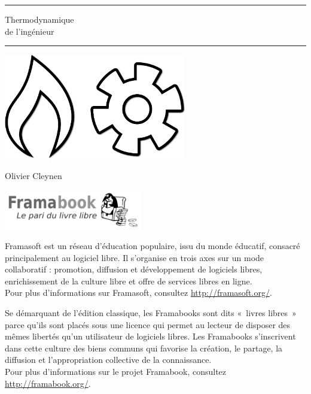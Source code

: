 \begin{titlepage}
\vspace*{4cm}
\begin{center}
	\vspace{1em}\par \rule{15cm}{.1pt}
	{\HUGE Thermodynamique\\ de l’ingénieur}
	\vspace{1em}\par \rule{15cm}{.1pt}

	\vspace{4cm}
	\includegraphics[width=8cm]{images/thermodynamics.png}
	\vspace{2cm}

	{\huge Olivier Cleynen}
	
	\hspace{0.5cm}\includegraphics[width=60mm]{images/Logo_framabook_grand.png}
\end{center}

\clearpage


\restoregeometry\pagestyle{empty}
\vspace*{5cm}
	Framasoft est un réseau d’éducation populaire, issu du monde éducatif, consacré principalement au logiciel libre. Il s’organise en trois axes sur un mode collaboratif : promotion, diffusion et développement de logiciels libres, enrichissement de la culture libre et offre de services libres en ligne.\\
	Pour plus d’informations sur Framasoft, consultez \href{http://framasoft.org/}{http://framasoft.org/}.
	
	Se démarquant de l’édition classique, les Framabooks sont dits «~livres libres~» parce qu’ils sont placés sous une licence qui permet au lecteur de disposer des mêmes libertés qu’un utilisateur de logiciels libres. Les Framabooks s’inscrivent dans cette culture des biens communs qui favorise la création, le partage, la diffusion et l’appropriation collective de la connaissance.\\
	Pour plus d’informations sur le projet Framabook, consultez \href{http://framabook.org/}{http://framabook.org/}.


\end{titlepage}
